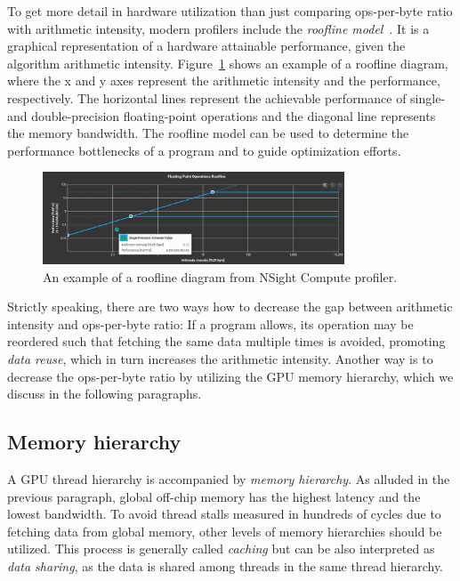 To get more detail in hardware utilization than just comparing ops-per-byte ratio with arithmetic intensity, modern profilers include the \emph{roofline model}~\cite{williams2009roofline}. It is a graphical representation of a hardware attainable performance, given the algorithm arithmetic intensity. Figure~\ref{fig:roof} shows an example of a roofline diagram, where the x and y axes represent the arithmetic intensity and the performance, respectively. The horizontal lines represent the achievable performance of single- and double-precision floating-point operations and the diagonal line represents the memory bandwidth. The roofline model can be used to determine the performance bottlenecks of a program and to guide optimization efforts.

\begin{figure}
    \centering
    \includegraphics[width=0.8\textwidth]{img/roofline.png}
    \caption{An example of a roofline diagram from NSight Compute profiler.}
    \label{fig:roof}
\end{figure}

Strictly speaking, there are two ways how to decrease the gap between arithmetic intensity and ops-per-byte ratio: If a program allows, its operation may be reordered such that fetching the same data multiple times is avoided, promoting \emph{data reuse}, which in turn increases the arithmetic intensity. Another way is to decrease the ops-per-byte ratio by utilizing the GPU memory hierarchy, which we discuss in the following paragraphs.

\subsection{Memory hierarchy}
\label{sec:memory_hier}

A GPU thread hierarchy is accompanied by \emph{memory hierarchy}. As alluded in the previous paragraph, global off-chip memory has the highest latency and the lowest bandwidth. To avoid thread stalls measured in hundreds of cycles due to fetching data from global memory, other levels of memory hierarchies should be utilized. This process is generally called \emph{caching} but can be also interpreted as \emph{data sharing}, as the data is shared among threads in the same thread hierarchy.

